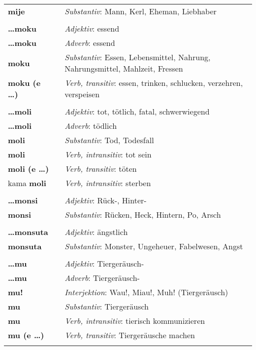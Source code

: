 \begin{supertabular}{p{2,5cm}|ll}
\textbf{mije} && \textit{Substantiv}: Mann, Kerl, Eheman, Liebhaber \\ 
 && \\ %
\textbf{\dots moku} && \textit{Adjektiv}: essend \\ 
\textbf{\dots moku} && \textit{Adverb}: essend \\ 
\textbf{moku} && \textit{Substantiv}: Essen, Lebensmittel, Nahrung, Nahrungsmittel, Mahlzeit, Fressen \\ 
\textbf{moku (e \dots)} && \textit{Verb, transitiv}: essen, trinken, schlucken, verzehren, verspeisen \\ 
 && \\ %
\textbf{\dots moli} && \textit{Adjektiv}: tot, tötlich, fatal, schwerwiegend \\ 
\textbf{\dots moli} && \textit{Adverb}: tödlich \\ 
\textbf{moli} && \textit{Substantiv}: Tod, Todesfall \\ 
\textbf{moli} && \textit{Verb, intransitiv}: tot sein \\ 
\textbf{moli (e \dots)} && \textit{Verb, transitiv}: töten \\ 
kama \textbf{moli} && \textit{Verb, intransitiv}: sterben \\ 
 && \\ %
\textbf{\dots monsi} && \textit{Adjektiv}: Rück-, Hinter- \\ 
\textbf{monsi} && \textit{Substantiv}: Rücken, Heck, Hintern, Po, Arsch \\ 
 && \\ %
\textbf{\dots monsuta} && \textit{Adjektiv}: ängstlich \\ 
\textbf{monsuta} && \textit{Substantiv}: Monster, Ungeheuer, Fabelwesen, Angst \\ 
 && \\ %
\textbf{\dots mu} && \textit{Adjektiv}: Tiergeräusch- \\ 
\textbf{\dots mu} && \textit{Adverb}: Tiergeräusch- \\ 
\textbf{mu!} && \textit{Interjektion}: Wau!, Miau!, Muh! (Tiergeräusch) \\ 
\textbf{mu} && \textit{Substantiv}: Tiergeräusch \\ 
\textbf{mu} && \textit{Verb, intransitiv}: tierisch kommunizieren \\ 
\textbf{mu (e \dots)} && \textit{Verb, transitiv}: Tiergeräusche machen \\ 
 && \\ %

\end{supertabular}
